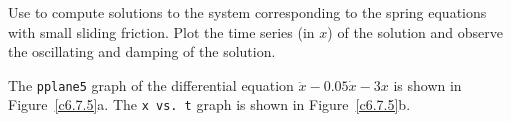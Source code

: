 \documentclass{ximera}
\begin{document}
\begin{computerExercise} \label{c6.7.5}
Use {\pplane} to compute solutions to the system corresponding to the
spring equations with small sliding friction.  Plot the time series (in $x$)
of the solution and observe the oscillating and damping of the solution.

\begin{solution}

The {\tt pplane5} graph of the differential equation
$\ddot{x} - 0.05\dot{x} - 3x$ is shown in Figure~\ref{c6.7.5}a.  The
{\tt x vs.\ t} graph is shown in Figure~\ref{c6.7.5}b.

\begin{figure}[htb]
                       \centerline{%
                       }
\end{figure}























\end{solution}
\end{computerExercise}
\end{document}
